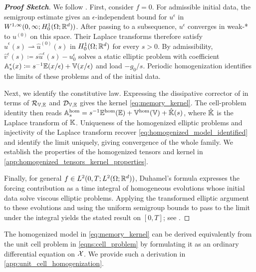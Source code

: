 \documentclass[3p, 12pt, preprint]{elsarticle}
\begin{document}
\begin{proof}[\bf Proof Sketch]
We follow \cite[Theorem 3.1]{francfort1986homogenization}. First, consider $f=0$. For admissible initial data, the semigroup estimate \cite[(3.20)]{francfort1986homogenization} gives an $\epsilon$-independent bound for $u^\epsilon$ in $W^{1,\infty}(0,\infty;H_0^1(\Omega;\mathbb{R}^d))$. After passing to a subsequence, $u^\epsilon$ converges in weak-* to $u^{(0)}$ on this space. Their Laplace transforms therefore satisfy $\hat u^\epsilon(s)\rightharpoonup\hat u^{(0)}(s)$ in $H_0^1(\Omega;\mathbb{R}^d)$ for every $s>0$. By admissibility, $\hat v^\epsilon(s)\coloneqq s\hat u^\epsilon(s)-u_0^\epsilon$ solves a static elliptic problem with coefficient $\mathbb{A}_s^\epsilon(x)\coloneqq s^{-1}\mathbb{E}(x/\epsilon)+\mathbb{V}(x/\epsilon)$ and load $-g_0/s$. Periodic homogenization identifies the limits of these problems and of the initial data.

Next, we identify the constitutive law. Expressing the dissipative corrector of \cite{francfort1986homogenization} in terms of ${\mathcal{R}}_{\mathbb{V},\mathbb{E}}$ and ${\mathcal{D}}_{\mathbb{V},\mathbb{E}}$ gives the kernel \cref{eq:memory_kernel}. The cell-problem identity \cite[(3.12)]{francfort1986homogenization} then reads $\mathbb{A}_s^{\mathrm{hom}}=s^{-1}\mathbb{E}^{\mathrm{hom}}(\mathbb{E})+\mathbb{V}^{\mathrm{hom}}(\mathbb{V})+\hat{\mathbb{K}}(s)$, where $\hat{\mathbb{K}}$ is the Laplace transform of $\mathbb{K}$. Uniqueness of the homogenized elliptic problems and injectivity of the Laplace transform recover \cref{eq:homogenized_model_identified} and identify the limit uniquely, giving convergence of the whole family. We establish the properties of the homogenized tensors and kernel in \cref{app:homogenized_tensors_kernel_properties}.

Finally, for general $f\in L^2(0,T;L^2(\Omega;\mathbb{R}^d))$, Duhamel's formula expresses the forcing contribution as a time integral of homogeneous evolutions whose initial data solve viscous elliptic problems. Applying the transformed elliptic argument to these evolutions and using the uniform semigroup bounds to pass to the limit under the integral yields the stated result on $[0,T]$; see \cite[(3.34)--(3.39)]{francfort1986homogenization}.
\end{proof}

\begin{remark}
    The homogenized model in \cref{eq:memory_kernel} can be derived equivalently from the unit cell problem in \cref{eqns:cell_problem} by formulating it as an ordinary differential equation on ${\mathcal{X}}$. We provide such a derivation in \cref{app:unit_cell_homogenization}.
\end{remark}
\end{document}
